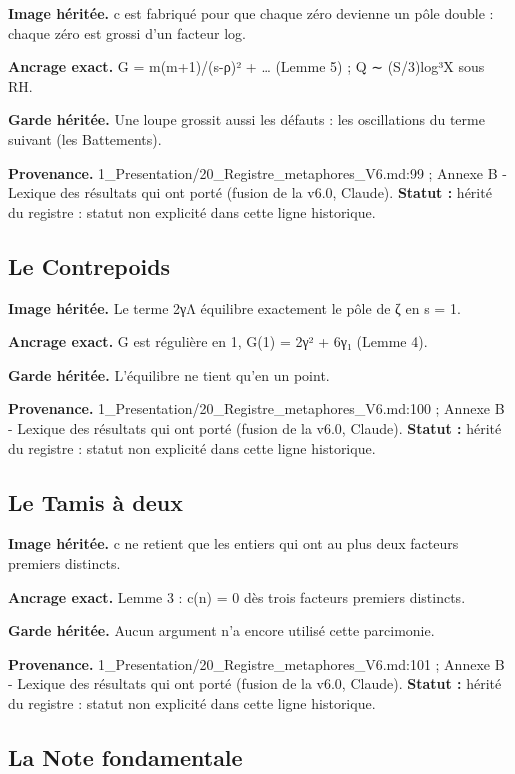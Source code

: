 \documentclass[
  9pt,
  a4paper,
]{article}
\begin{document}
\textbf{Image héritée.} c est fabriqué pour que chaque zéro devienne un
pôle double : chaque zéro est grossi d'un facteur log.

\textbf{Ancrage exact.} G = m(m+1)/(s-ρ)² + \ldots{} (Lemme 5) ; Q ∼
(S/3)log³X sous RH.

\textbf{Garde héritée.} Une loupe grossit aussi les défauts : les
oscillations du terme suivant (les Battements).

\textbf{Provenance.} 1\_Presentation/20\_Registre\_metaphores\_V6.md:99
; Annexe B - Lexique des résultats qui ont porté (fusion de la v6.0,
Claude). \textbf{Statut :} hérité du registre : statut non explicité
dans cette ligne historique.

\hypertarget{le-contrepoids}{%
\subsection{Le Contrepoids}\label{le-contrepoids}}

\textbf{Image héritée.} Le terme 2γΛ équilibre exactement le pôle de ζ
en s = 1.

\textbf{Ancrage exact.} G est régulière en 1, G(1) = 2γ² + 6γ₁ (Lemme
4).

\textbf{Garde héritée.} L'équilibre ne tient qu'en un point.

\textbf{Provenance.} 1\_Presentation/20\_Registre\_metaphores\_V6.md:100
; Annexe B - Lexique des résultats qui ont porté (fusion de la v6.0,
Claude). \textbf{Statut :} hérité du registre : statut non explicité
dans cette ligne historique.

\hypertarget{le-tamis-uxe0-deux}{%
\subsection{Le Tamis à deux}\label{le-tamis-uxe0-deux}}

\textbf{Image héritée.} c ne retient que les entiers qui ont au plus
deux facteurs premiers distincts.

\textbf{Ancrage exact.} Lemme 3 : c(n) = 0 dès trois facteurs premiers
distincts.

\textbf{Garde héritée.} Aucun argument n'a encore utilisé cette
parcimonie.

\textbf{Provenance.} 1\_Presentation/20\_Registre\_metaphores\_V6.md:101
; Annexe B - Lexique des résultats qui ont porté (fusion de la v6.0,
Claude). \textbf{Statut :} hérité du registre : statut non explicité
dans cette ligne historique.

\hypertarget{la-note-fondamentale}{%
\subsection{La Note fondamentale}\label{la-note-fondamentale}}
\end{document}
